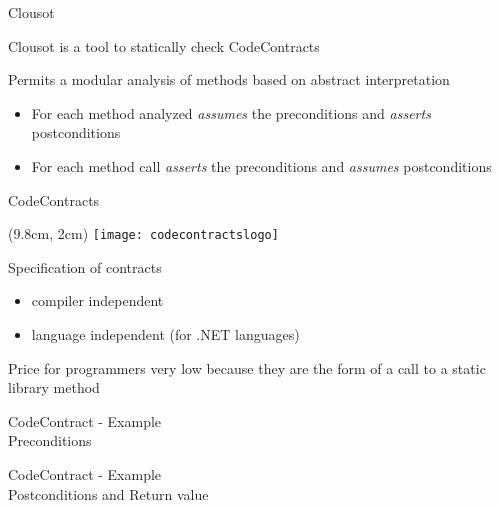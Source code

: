 \begin{frame}{Clousot}

Clousot is a tool to statically check CodeContracts

\vspace*{1cm}

Permits a modular analysis of methods based on abstract interpretation
\begin{itemize}
  \item For each method analyzed \emph{assumes} the preconditions and
  \emph{asserts} postconditions

  \item For each method call \emph{asserts} the preconditions and
  \emph{assumes} postconditions
\end{itemize}

\end{frame}



\begin{frame}{CodeContracts}

\begin{textblock*}{1cm}(9.8cm, 2cm)
    \texttt{[image: codecontractslogo]}
\end{textblock*}

Specification of contracts
\begin{itemize}
  \item compiler independent
  \item language independent (for .NET languages)
\end{itemize}

\vspace*{1cm}

Price for programmers very low because they are the form of a call to a static
library method

\end{frame}


\begin{frame}[fragile]{CodeContract - Example\\Preconditions}
\vspace*{-0.4cm}

\end{frame}



\begin{frame}[fragile]{CodeContract - Example\\Postconditions and Return value}
\vspace*{-0.3cm}

\end{frame}



